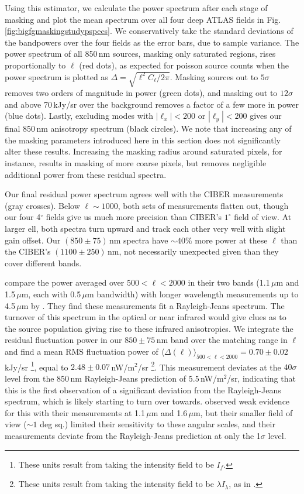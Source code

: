 \documentclass{emulateapj}
\begin{document}
Using this estimator, we calculate the power spectrum after each stage of masking and plot the mean spectrum over all four deep ATLAS fields in Fig. \ref{fig:bigfgmaskingstudypspecs}. We conservatively take the standard deviations of the bandpowers over the four fields as the error bars, due to sample variance. The power spectrum of all 850\,nm sources, masking only saturated regions, rises proportionally to $\ell$ (red dots), as expected for poisson source counts when the power spectrum is plotted as $\Delta=\sqrt{\ell^2C_\ell/2\pi}$. Masking sources out to $5\sigma$ removes two orders of magnitude in power (green dots), and masking out to $12\sigma$ and above 70\,kJy/sr over the background removes a factor of a few more in power (blue dots). Lastly, excluding modes with $|\ell_x|<200$ or $|\ell_y|<200$ gives our final 850\,nm anisotropy spectrum (black circles). We note that increasing any of the masking parameters introduced here in this section does not significantly alter these results. Increasing the masking radius around saturated pixels, for instance, results in masking of more coarse pixels, but removes negligible additional power from these residual spectra. 

Our final residual power spectrum agrees well with the CIBER measurements (gray crosses). Below $\ell\sim1000$, both sets of measurements flatten out, though our  four 4$^\circ$ fields give us much more precision than CIBER's $1^\circ$ field of view. At larger ell, both spectra turn upward  and track each other very well with slight gain offset. Our $(850\pm75)$\,nm spectra have $\sim40\%$ more power at these $\ell$ than the CIBER's $(1100\pm250)$\,nm, not necessarily unexpected given than they cover different bands.

\citet{zemcov14} compare the power averaged over $500<\ell<2000$ in their two bands (1.1\,$\mu$m and 1.5\,$\mu$m, each with 0.5\,$\mu$m bandwidth) with longer wavelength measurements up to 4.5\,$\mu$m by \citet{cooray12,kash3,matsumoto11}. They find these measurements fit a Rayleigh-Jeans spectrum. The turnover of this spectrum in the optical or near infrared would give clues as to the source population giving rise to these infrared anisotropies. We integrate the residual fluctuation power in our $850\pm75$\,nm band over the matching range in $\ell$ and find a mean RMS fluctuation power of $\langle\Delta(\ell)\rangle_{500<\ell<2000}=0.70\pm0.02$\,kJy/sr \footnote{These units result from taking the intensity field to be $I_f$.}, equal to $2.48\pm0.07$\,nW/m$^2$/sr \footnote{These units result from taking the intensity field to be $\lambda I_\lambda$, as in \citet{zemcov14}.}. This measurement deviates at the $40\sigma$ level from the 850\,nm Rayleigh-Jeans prediction of 5.5\,nW/m$^2$/sr, indicating that this is the first observation of a significant deviation from the Rayleigh-Jeans spectrum, which is likely starting to turn over towards. \citet{zemcov14} observed weak evidence for this with their measurements at 1.1\,$\mu$m and 1.6\,$\mu$m, but their smaller field of view ($\sim1$ deg sq.) limited their sensitivity to these angular scales, and their measurements deviate from the Rayleigh-Jeans prediction at only the 1$\sigma$ level. 
\end{document}
